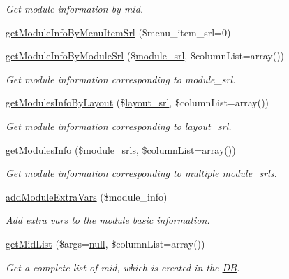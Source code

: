 \begin{DoxyCompactItemize}
\begin{DoxyCompactList}\small\item\em Get module information by mid. \end{DoxyCompactList}\item 
\hyperlink{classmoduleModel_a48fc8aa25e189a13e7416d4c92e3aa04}{get\+Module\+Info\+By\+Menu\+Item\+Srl} (\$menu\+\_\+item\+\_\+srl=0)
\item 
\hyperlink{classmoduleModel_aa31240372b98008ff8a2ad689535d3a9}{get\+Module\+Info\+By\+Module\+Srl} (\$\hyperlink{ko_8install_8php_a370bb6450fab1da3e0ed9f484a38b761}{module\+\_\+srl}, \$column\+List=array())
\begin{DoxyCompactList}\small\item\em Get module information corresponding to module\+\_\+srl. \end{DoxyCompactList}\item 
\hyperlink{classmoduleModel_a512433daf11267d2bcfafed99caea883}{get\+Modules\+Info\+By\+Layout} (\$\hyperlink{ko_8install_8php_a70054876db09b2519a1726663c8dd9e7}{layout\+\_\+srl}, \$column\+List=array())
\begin{DoxyCompactList}\small\item\em Get module information corresponding to layout\+\_\+srl. \end{DoxyCompactList}\item 
\hyperlink{classmoduleModel_afc4f6749feac12e176959c170ee25012}{get\+Modules\+Info} (\$module\+\_\+srls, \$column\+List=array())
\begin{DoxyCompactList}\small\item\em Get module information corresponding to multiple module\+\_\+srls. \end{DoxyCompactList}\item 
\hyperlink{classmoduleModel_ae8f36b54364eedca852624d015d99258}{add\+Module\+Extra\+Vars} (\$module\+\_\+info)
\begin{DoxyCompactList}\small\item\em Add extra vars to the module basic information. \end{DoxyCompactList}\item 
\hyperlink{classmoduleModel_a455828df6cdf405ba9b77d242faf8651}{get\+Mid\+List} (\$args=\hyperlink{modernizr_8min_8js_a286f9ec831c5e676eeb493248eab9575}{null}, \$column\+List=array())
\begin{DoxyCompactList}\small\item\em Get a complete list of mid, which is created in the \hyperlink{classDB}{DB}. \end{DoxyCompactList}\item 

\end{DoxyCompactItemize}
